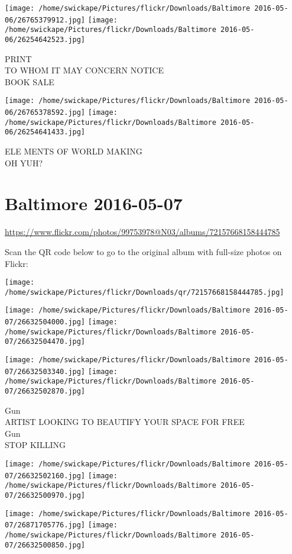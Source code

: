 \documentclass[10pt,letterpaper]{article}
\begin{document}
\vspace{0.25in}
\texttt{[image: /home/swickape/Pictures/flickr/Downloads/Baltimore 2016-05-06/26765379912.jpg]}
\texttt{[image: /home/swickape/Pictures/flickr/Downloads/Baltimore 2016-05-06/26254642523.jpg]}

PRINT\\
TO WHOM IT MAY CONCERN NOTICE\\
BOOK SALE
\pagebreak

\texttt{[image: /home/swickape/Pictures/flickr/Downloads/Baltimore 2016-05-06/26765378592.jpg]}
\texttt{[image: /home/swickape/Pictures/flickr/Downloads/Baltimore 2016-05-06/26254641433.jpg]}

ELE MENTS OF WORLD MAKING\\
OH YUH?
\pagebreak

\section*{Baltimore 2016-05-07}

\url{https://www.flickr.com/photos/99753978@N03/albums/72157668158444785}

Scan the QR code below to go to the original album with full-size photos on Flickr:

\texttt{[image: /home/swickape/Pictures/flickr/Downloads/qr/72157668158444785.jpg]}
\pagebreak

\texttt{[image: /home/swickape/Pictures/flickr/Downloads/Baltimore 2016-05-07/26632504000.jpg]}
\texttt{[image: /home/swickape/Pictures/flickr/Downloads/Baltimore 2016-05-07/26632504470.jpg]}

\texttt{[image: /home/swickape/Pictures/flickr/Downloads/Baltimore 2016-05-07/26632503340.jpg]}
\texttt{[image: /home/swickape/Pictures/flickr/Downloads/Baltimore 2016-05-07/26632502870.jpg]}

Gun\\
ARTIST LOOKING TO BEAUTIFY YOUR SPACE FOR FREE\\
Gun\\
STOP KILLING
\pagebreak

\texttt{[image: /home/swickape/Pictures/flickr/Downloads/Baltimore 2016-05-07/26632502160.jpg]}
\texttt{[image: /home/swickape/Pictures/flickr/Downloads/Baltimore 2016-05-07/26632500970.jpg]}

\texttt{[image: /home/swickape/Pictures/flickr/Downloads/Baltimore 2016-05-07/26871705776.jpg]}
\texttt{[image: /home/swickape/Pictures/flickr/Downloads/Baltimore 2016-05-07/26632500850.jpg]}
\end{document}
